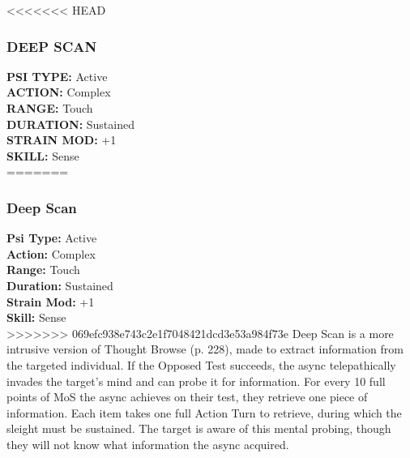 <<<<<<< HEAD \subsubsection{DEEP SCAN} \textbf{PSI TYPE:} Active \\ \textbf{ACTION:} Complex \\ \textbf{RANGE:} Touch \\ \textbf{DURATION:} Sustained \\ \textbf{STRAIN MOD:} +1 \\ \textbf{SKILL:} Sense\\ ======= \subsubsection{Deep Scan} \textbf{Psi Type:} Active \\ \textbf{Action:} Complex \\ \textbf{Range:} Touch \\ \textbf{Duration:} Sustained \\ \textbf{Strain Mod:} +1 \\ \textbf{Skill:} Sense\\ >>>>>>> 069efc938e743c2e1f7048421dcd3e53a984f73e Deep Scan is a more intrusive version of Thought Browse (p. 228), made to extract information from the targeted individual. If the Opposed Test succeeds, the async telepathically invades the target’s mind and can probe it for information. For every 10 full points of MoS the async achieves on their test, they retrieve one piece of information. Each item takes one full Action Turn to retrieve, during which the sleight must be sustained. The target is aware of this mental probing, though they will not know what information the async acquired. 

